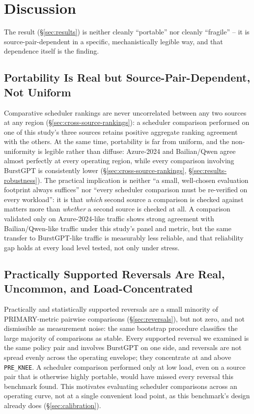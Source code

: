 \section{Discussion}
\label{sec:discussion}

The result (\S\ref{sec:results}) is neither cleanly ``portable'' nor
cleanly ``fragile'' -- it is source-pair-dependent in a specific,
mechanistically legible way, and that dependence itself is the finding.

\subsection{Portability Is Real but Source-Pair-Dependent, Not Uniform}

Comparative scheduler rankings are never uncorrelated between any two
sources at any region (\S\ref{sec:cross-source-rankings}): a scheduler
comparison performed on one of this study's three sources retains
positive aggregate ranking agreement with the others. At the same time,
portability is far from uniform, and the non-uniformity is legible rather
than diffuse: Azure-2024 and Bailian/Qwen agree almost perfectly at every
operating region, while every comparison involving BurstGPT is consistently
lower (\S\ref{sec:cross-source-rankings},
\S\ref{sec:results-robustness}). The
practical implication is neither ``a small, well-chosen evaluation
footprint always suffices'' nor ``every scheduler comparison must be
re-verified on every workload'': it is that \emph{which} second source a
comparison is checked against matters more than \emph{whether} a second
source is checked at all. A comparison validated only on Azure-2024-like
traffic shows strong agreement with Bailian/Qwen-like traffic under
this study's panel and metric, but the same transfer to BurstGPT-like
traffic is measurably less reliable, and that reliability gap holds at
every load level tested, not only under stress.

\subsection{Practically Supported Reversals Are Real, Uncommon, and
Load-Concentrated}

Practically and statistically supported reversals are a small minority of
PRIMARY-metric pairwise comparisons (\S\ref{sec:reversals}), but not zero,
and not dismissible as measurement noise: the same bootstrap procedure
classifies the large majority of comparisons as stable. Every supported
reversal we examined is the same policy pair and involves BurstGPT on one
side, and reversals are not spread evenly across the operating envelope;
they concentrate at and above \texttt{PRE\_KNEE}. A scheduler comparison performed only at low load,
even on a source pair that is otherwise highly portable, would have missed
every reversal this benchmark found. This motivates evaluating scheduler
comparisons across an operating curve, not at a single convenient load
point, as this benchmark's design already does
(\S\ref{sec:calibration}).

